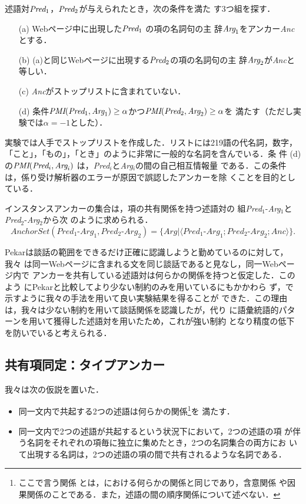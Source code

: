 \documentclass[japanese]{jnlp_1.4}
\begin{document}
述語対$\emph{Pred}_1$，$\emph{Pred}_2$が与えられたとき，次の条件を満た
す3つ組を探す．
\begin{itemize}
\item[(a)] Webページ中に出現した$\emph{Pred}_1$ の項の名詞句の主
  辞$\emph{Arg}_1$をアンカー\emph{Anc}とする．
\item[(b)] (a)と同じWebページに出現する$\emph{Pred}_2$の項の名詞句の主
  辞$\emph{Arg}_2$が\emph{Anc}と等しい．
\item[(c)] \emph{Anc}がストップリストに含まれていない．
\item[(d)] 条件$\textit{PMI}(\emph{Pred}_1, \emph{Arg}_1) \geq
  \alpha$かつ$\textit{PMI}(\emph{Pred}_2, \emph{Arg}_2) \geq \alpha$を
  満たす（ただし実験では$\alpha=-1$とした）．
\end{itemize}
実験では人手でストップリストを作成した．リストには219語の代名詞，数字，
「こと」，「もの」，「とき」のように非常に一般的な名詞を含んでいる．条
件 (d) の$\textit{PMI}(\emph{Pred}_i,
\emph{Arg}_i)$ は，\emph{Pred}$_i$と\emph{Arg}$_i$の間の自己相互情報量
である．この条件は，係り受け解析器のエラーが原因で誤認したアンカーを除
くことを目的としている．

インスタンスアンカーの集合は，項の共有関係を持つ述語対の
組\emph{Pred}$_1$-\emph{Arg}$_1$と\emph{Pred}$_2$-\emph{Arg}$_2$から次
のように求められる．
\[
 \mathit{AnchorSet}(\mathit{Pred}_1\text{-}\mathit{Arg}_1, \mathit{Pred}_2\text{-}\mathit{Arg}_2) 
  =\{\mathit{Arg}|\langle \mathit{Pred}_1\text{-}\mathit{Arg}_1; \mathit{Pred}_2\text{-}\mathit{Arg}_2; \mathit{Anc} \rangle\}.
\]

Pekarは談話の範囲をできるだけ正確に認識しようと勤めているのに対して，我々
は同一Webページに含まれる文を同じ談話であると見なし，同一Webページ内で
アンカーを共有している述語対は何らかの関係を持つと仮定した．このよう
にPekarと比較してより少ない制約のみを用いているにもかかわら
ず，で示すように我々の手法を用いて良い実験結果を得ることが
できた．この理由は，我々は少ない制約を用いて談話関係を認識したが，代り
に語彙統語的パターンを用いて獲得した述語対を用いたため，これが強い制約
となり精度の低下を防いでいると考えられる．


\subsection{共有項同定：タイプアンカー}
\label{ssec:type_anc}

我々は次の仮説を置いた．
\begin{itemize}
\item 同一文内で共起する2つの述語は何らかの関係\footnote{ここで言う関係
    とは，における何らかの関係と同じであり，含意関係
    や因果関係のことである．また，述語の間の順序関係について述べない．}を
  満たす．
\item 同一文内で2つの述語が共起するという状況下において，2つの述語の項
  が伴う名詞をそれぞれの項毎に独立に集めたとき，2つの名詞集合の両方にお
  いて出現する名詞は，2つの述語の項の間で共有されるような名詞である．
\end{itemize}
\end{document}
